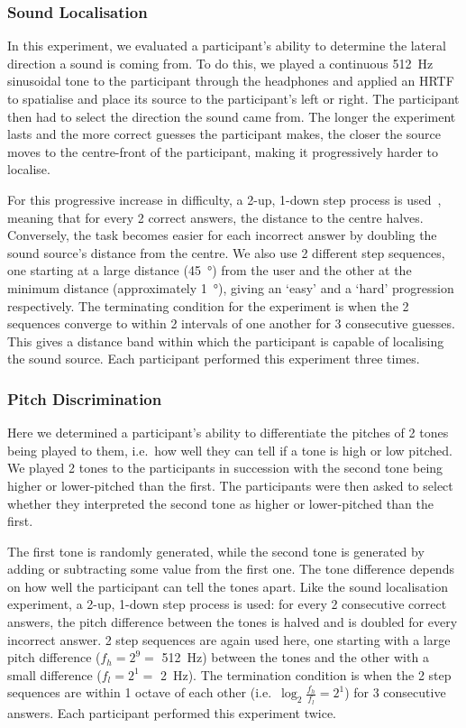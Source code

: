 \documentclass{article}
\begin{document}
\subsubsection{Sound Localisation}

In this experiment, we evaluated a participant's ability to determine the lateral direction a sound is coming from.
To do this, we played a continuous \SI{512}{\hertz} sinusoidal tone to the participant through the headphones and applied an HRTF to spatialise and place its source to the participant's left or right.
The participant then had to select the direction the sound came from.
The longer the experiment lasts and the more correct guesses the participant makes, the closer the source moves to the centre-front of the participant, making it progressively harder to localise. 

For this progressive increase in difficulty, a 2-up, 1-down step process is used~\cite{wetherill1965sequential,levitt1971transformed}, meaning that for every 2 correct answers, the distance to the centre halves.
Conversely, the task becomes easier for each incorrect answer by doubling the sound source's distance from the centre.
We also use 2 different step sequences, one starting at a large distance (\SI{45}{\degree}) from the user and the other at the minimum distance (approximately \SI{1}{\degree}), giving an `easy' and a `hard' progression respectively.
The terminating condition for the experiment is when the 2 sequences converge to within 2 intervals of one another for 3 consecutive guesses.
This gives a distance band within which the participant is capable of localising the sound source.
Each participant performed this experiment three times. 

\subsubsection{Pitch Discrimination}

Here we determined a participant's ability to differentiate the pitches of 2 tones being played to them, i.e.\ how well they can tell if a tone is high or low pitched.
We played 2 tones to the participants in succession with the second tone being higher or lower-pitched than the first.
The participants were then asked to select whether they interpreted the second tone as higher or lower-pitched than the first.

The first tone is randomly generated, while the second tone is generated by adding or subtracting some value from the first one.
The tone difference depends on how well the participant can tell the tones apart.
Like the sound localisation experiment, a 2-up, 1-down step process is used: for every 2 consecutive correct answers, the pitch difference between the tones is halved and is doubled for every incorrect answer.
2 step sequences are again used here, one starting with a large pitch difference ($f_h=2^9=$ \SI{512}{\hertz}) between the tones and the other with a small difference ($f_l=2^1=$ \SI{2}{\hertz}).
The termination condition is when the 2 step sequences are within 1 octave of each other (i.e.\ $\log_2\frac{f_h}{f_l}=2^1$) for 3 consecutive answers.
Each participant performed this experiment twice. 
\end{document}
